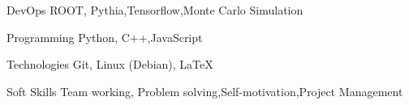 

\begin{cvskills}

  \cvskill
    {DevOps} %
    {ROOT, Pythia,Tensorflow,Monte Carlo Simulation} %


  \cvskill
    {Programming} %
    { Python, C++,JavaScript} %

  \cvskill
    {Technologies} %
    { Git,  Linux (Debian), \LaTeX} %

      \cvskill
    {Soft Skills} %
    {Team working, Problem solving,Self-motivation,Project Management} %


\end{cvskills}
